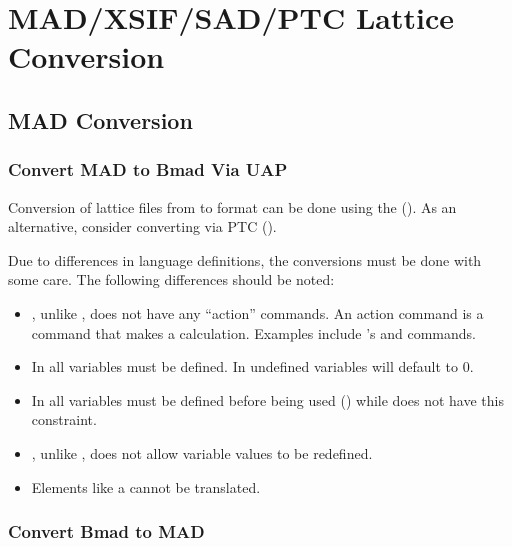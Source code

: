 \chapter{MAD/XSIF/SAD/PTC Lattice Conversion}
\label{c:lat.convert}

\section{MAD Conversion}
\label{s:mad.convert}

\subsection{Convert MAD to Bmad Via UAP}
\label{s:mad.bmad.uap}

Conversion of lattice files from \mad to \bmad format can be done using the  (). As an alternative, consider converting via PTC
().

Due to differences in language definitions, the conversions must be done with some
care. The following differences should be noted:
  \begin{itemize}
  \item
\bmad, unlike \mad, does not have any ``action'' commands. An action
command is a command that makes a calculation. Examples include \mad's
 and  commands.
  \item
In \bmad all variables must be defined. In \mad undefined variables
will default to 0.
  \item
In \bmad all variables must be defined before being used
() while \mad does not have this constraint.
  \item
\bmad, unlike \mad, does not allow variable values to be redefined.
  \item
Elements like a  cannot be translated.
  \end{itemize}

\subsection{Convert Bmad to MAD}
\label{s:bmad.mad}

